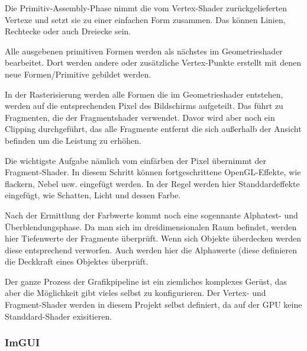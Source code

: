 Die Primitiv-Assembly-Phase nimmt die vom Vertex-Shader zurückgelieferten Vertexe und setzt sie zu einer einfachen Form zusammen. Das können Linien, Rechtecke oder auch Dreiecke sein.

Alle ausgebenen primitiven Formen werden als nächstes im Geometrieshader bearbeitet. Dort werden andere oder zusätzliche Vertex-Punkte erstellt mit denen neue Formen/Primitive gebildet werden.

In der Rasterisierung werden alle Formen die im Geometrieshader entstehen, werden auf die entsprechenden Pixel des Bildschirms aufgeteilt. Das führt zu Fragmenten, die der Fragmentshader verwendet. Davor wird aber noch ein Clipping durchgeführt, das alle Fragmente entfernt die sich außerhalb der Ansicht befinden um die Leistung zu erhöhen.

Die wichtigste Aufgabe nämlich vom einfärben der Pixel übernimmt der Fragment-Shader. In diesem Schritt können fortgeschrittene OpenGL-Effekte, wie flackern, Nebel usw. eingefügt werden. In der Regel werden hier Standdardeffekte eingefügt, wie Schatten, Licht und dessen Farbe.

Nach der Ermittlung der Farbwerte kommt noch eine sogennante Alphatest- und Überblendungsphase. Da man sich im dreidimensionalen Raum befindet, werden hier Tiefenwerte der Fragmente überprüft. Wenn sich Objekte überdecken werden diese entsprechend verworfen. Auch werden hier die Alphawerte (diese definieren die Deckkraft eines Objektes überprüft.

Der ganze Prozess der Grafikpipeline ist ein ziemliches komplexes Gerüst, das aber die Möglichkeit gibt vieles selbst zu konfigurieren. Der Vertex- und Fragment-Shader werden in diesem Projekt selbst definiert, da auf der GPU keine Standdard-Shader exisitieren.





\subsubsection{ImGUI}